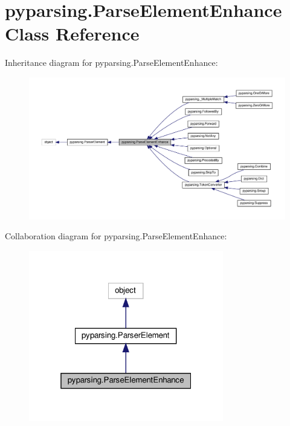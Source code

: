 \hypertarget{classpyparsing_1_1ParseElementEnhance}{}\section{pyparsing.\+Parse\+Element\+Enhance Class Reference}
\label{classpyparsing_1_1ParseElementEnhance}


Inheritance diagram for pyparsing.\+Parse\+Element\+Enhance\+:
\nopagebreak
\begin{figure}[H]
\begin{center}
\leavevmode
\includegraphics[width=350pt]{classpyparsing_1_1ParseElementEnhance__inherit__graph}
\end{center}
\end{figure}


Collaboration diagram for pyparsing.\+Parse\+Element\+Enhance\+:
\nopagebreak
\begin{figure}[H]
\begin{center}
\leavevmode
\includegraphics[width=241pt]{classpyparsing_1_1ParseElementEnhance__coll__graph}
\end{center}
\end{figure}
